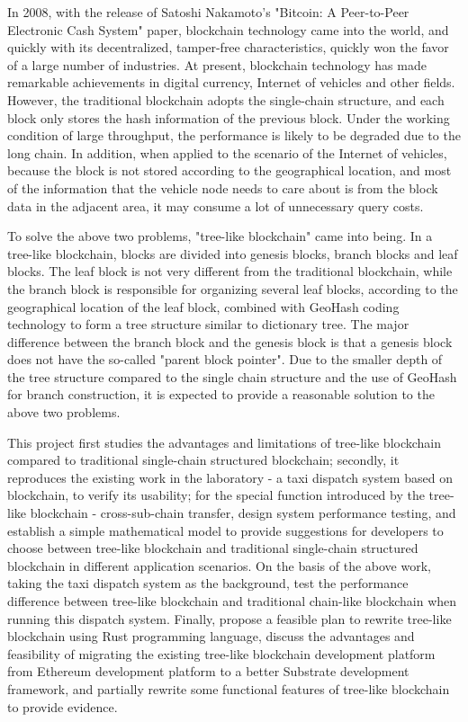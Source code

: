 \begin{abstractEn}
In 2008, with the release of Satoshi Nakamoto's "Bitcoin: A Peer-to-Peer Electronic Cash System" paper, blockchain technology came into the world, and quickly with its decentralized, tamper-free characteristics, quickly won the favor of a large number of industries. At present, blockchain technology has made remarkable achievements in digital currency, Internet of vehicles and other fields. However, the traditional blockchain adopts the single-chain structure, and each block only stores the hash information of the previous block. Under the working condition of large throughput, the performance is likely to be degraded due to the long chain. In addition, when applied to the scenario of the Internet of vehicles, because the block is not stored according to the geographical location, and most of the information that the vehicle node needs to care about is from the block data in the adjacent area, it may consume a lot of unnecessary query costs.

To solve the above two problems, "tree-like blockchain" came into being. In a tree-like blockchain, blocks are divided into genesis blocks, branch blocks and leaf blocks. The leaf block is not very different from the traditional blockchain, while the branch block is responsible for organizing several leaf blocks, according to the geographical location of the leaf block, combined with GeoHash coding technology to form a tree structure similar to dictionary tree. The major difference between the branch block and the genesis block is that a genesis block does not have the so-called "parent block pointer". Due to the smaller depth of the tree structure compared to the single chain structure and the use of GeoHash for branch construction, it is expected to provide a reasonable solution to the above two problems.

This project first studies the advantages and limitations of tree-like blockchain compared to traditional single-chain structured blockchain; secondly, it reproduces the existing work in the laboratory - a taxi dispatch system based on blockchain, to verify its usability; for the special function introduced by the tree-like blockchain - cross-sub-chain transfer, design system performance testing, and establish a simple mathematical model to provide suggestions for developers to choose between tree-like blockchain and traditional single-chain structured blockchain in different application scenarios. On the basis of the above work, taking the taxi dispatch system as the background, test the performance difference between tree-like blockchain and traditional chain-like blockchain when running this dispatch system. Finally, propose a feasible plan to rewrite tree-like blockchain using Rust programming language, discuss the advantages and feasibility of migrating the existing tree-like blockchain development platform from Ethereum development platform to a better Substrate development framework, and partially rewrite some functional features of tree-like blockchain to provide evidence.

\end{abstractEn}
